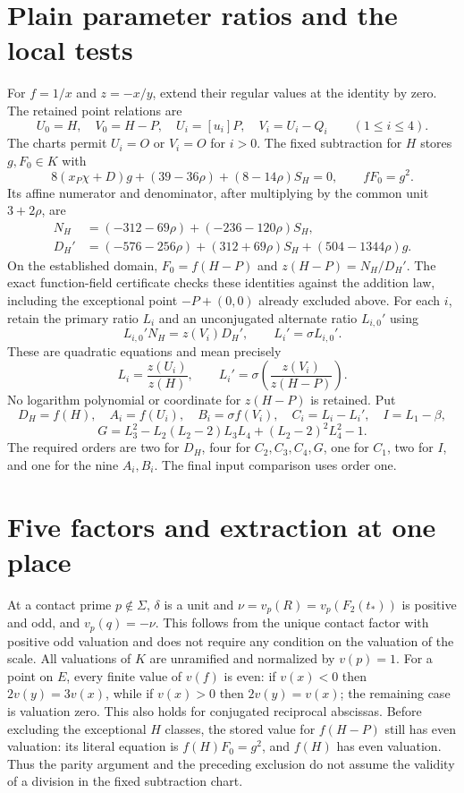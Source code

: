 \documentclass[11pt,a4paper]{article}
\begin{document}
\section{Plain parameter ratios and the local tests}
For $f=1/x$ and $z=-x/y$, extend their regular values at the
identity by zero. The retained point relations are
\[
 U_0=H,\quad V_0=H-P,\quad U_i=[u_i]P,\quad V_i=U_i-Q_i
 \qquad(1\le i\le4).
\]
The charts permit $U_i=O$ or $V_i=O$ for $i>0$.
The fixed subtraction for $H$ stores $g,F_0\in K$ with
\[
 8(x_P\chi+D)g+(39-36\rho)+(8-14\rho)S_H=0,
 \qquad fF_0=g^2.
\]
Its affine numerator and denominator, after multiplying by the
common unit $3+2\rho$, are
\[
 \begin{split}
 N_H&=(-312-69\rho)+(-236-120\rho)S_H,\\
 D_H'&=(-576-256\rho)+(312+69\rho)S_H+(504-1344\rho)g.
 \end{split}
\]
On the established domain, $F_0=f(H-P)$ and $z(H-P)=N_H/D_H'$.
The exact function-field certificate checks these identities against
the addition law, including the exceptional point
$-P+(0,0)$ already excluded above.
For each $i$, retain the primary ratio $L_i$ and an unconjugated
alternate ratio $L_{i,0}'$ using
\[
             L_{i,0}'N_H=z(V_i)D_H',\qquad L_i'=\sigma L_{i,0}'.
\]
These are quadratic equations and mean precisely
\[
       L_i=\frac{z(U_i)}{z(H)},\qquad
       L_i'=\sigma\!\left(\frac{z(V_i)}{z(H-P)}\right).
\]
No logarithm polynomial or coordinate for $z(H-P)$ is retained.
Put
\[
 D_H=f(H),\quad A_i=f(U_i),\quad B_i=\sigma f(V_i),\quad
 C_i=L_i-L_i',\quad I=L_1-\beta,
\]
\[
 G=L_3^2-L_2(L_2-2)L_3L_4+(L_2-2)^2L_4^2-1.
\]
The required orders are two for $D_H$, four for $C_2,C_3,C_4,G$,
one for $C_1$, two for $I$, and one for the nine $A_i,B_i$.
The final input comparison uses order one.

\section{Five factors and extraction at one place}
At a contact prime $p\notin\Sigma$, $\delta$ is a unit and
$\nu=v_p(R)=v_p(F_2(t_*))$ is positive and odd, and $v_p(q)=-\nu$. This follows
from the unique contact factor with positive odd valuation and
does not require any condition on the valuation of the scale. All valuations
of $K$ are unramified and normalized by $v(p)=1$.
For a point on $E$, every finite value of $v(f)$ is even: if
$v(x)<0$ then $2v(y)=3v(x)$, while if $v(x)>0$ then
$2v(y)=v(x)$; the remaining case is valuation zero.
This also holds for conjugated reciprocal abscissas. Before excluding
the exceptional $H$ classes, the stored value for $f(H-P)$ still has even
valuation: its literal equation is $f(H)F_0=g^2$, and $f(H)$ has even
valuation. Thus the parity argument and the preceding exclusion do not
assume the validity of a division in the fixed subtraction chart.
\end{document}
